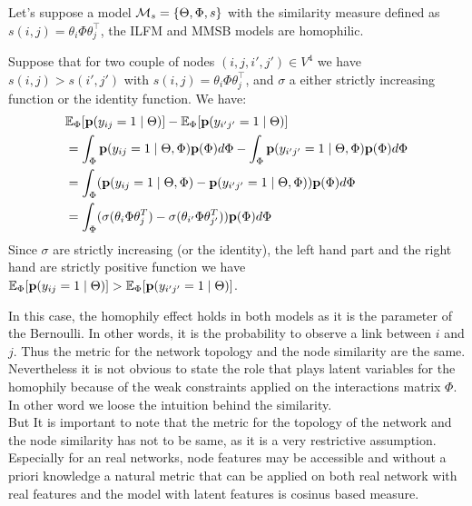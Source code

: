 \begin{proposition}[]
Let's suppose a model $ \mathcal{M}_s=\{\Theta, \Phi, s\}$ with the similarity measure defined as $s(i,j) = \theta_i \Phi \theta_j^\top$, the ILFM and MMSB models are homophilic.
\end{proposition}

\begin{IEEEproof}
Suppose that for two couple of nodes $(i,j,i',j') \in V^4$ we have $s(i,j) > s(i',j')$ with $s(i,j) =\theta_i \Phi \theta_j^\top$, and $\sigma$ a either strictly increasing function or the identity function. We have:
\begin{align}
&\mathbb{E}_\Phi[\mathbf{p}(y_{ij}=1 \mid \Theta)] - \mathbb{E}_\Phi[\mathbf{p}(y_{i'j'} = 1  \mid \Theta)] \\
&= \int_{\Phi} \mathbf{p}(y_{ij}=1 \mid \Theta, \Phi ) \mathbf{p}(\Phi) d\Phi - \int_{\Phi}\mathbf{p}(y_{i'j'}=1 \mid \Theta, \Phi ) \mathbf{p}(\Phi) d\Phi \\
&= \int_\Phi ( \mathbf{p}(y_{ij}=1 \mid \Theta, \Phi )  - \mathbf{p}(y_{i'j'}=1 \mid \Theta, \Phi ) )\mathbf{p}(\Phi) d\Phi \\
&=  \int_\Phi ( \sigma(\theta_i \Phi  \theta_j^T) -\sigma(\theta_{i'} \Phi  \theta_{j'}^T) )\mathbf{p}(\Phi) d\Phi
\end{align}
Since $\sigma$ are strictly increasing (or the identity), the left hand part and the right hand are strictly positive function we have $\mathbb{E}_\Phi[\mathbf{p}(y_{ij}=1 \mid \Theta)] > \mathbb{E}_\Phi[\mathbf{p}(y_{i'j'} = 1  \mid \Theta)]$.~\\
\end{IEEEproof}

In this case, the homophily effect holds in both models as it is the parameter of the Bernoulli. In other words, it is the probability to observe a link between $i$ and $j$. Thus the metric for the network topology and the node similarity are the same. Nevertheless it is not obvious to state the role that plays latent variables for the homophily because of the weak constraints applied on the interactions matrix $\Phi$. In other word we loose the intuition behind the similarity. ~\\

But It is important to note that the metric for the topology of the network and the node similarity has not to be same, as it is a very restrictive assumption. Especially for an real networks, node features may be accessible and without a priori knowledge a natural metric that can be applied on both real network with real features and the model with latent features is cosinus based measure.~\\

